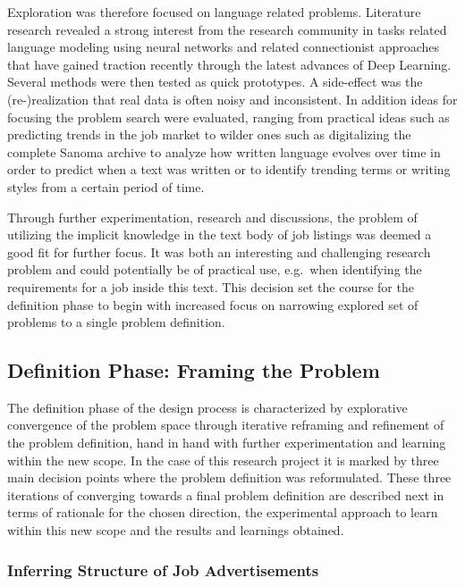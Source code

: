 Exploration was therefore focused on language related problems. Literature research revealed a strong interest from the research community in tasks related language modeling using neural networks and related connectionist approaches that have gained traction recently through the latest advances of \gls{Deep Learning}. Several methods were then tested as quick prototypes. A side-effect was the (re-)realization that real data is often noisy and inconsistent. In addition ideas for focusing the problem search were evaluated, ranging from practical ideas such as predicting trends in the job market to wilder ones such as digitalizing the complete Sanoma archive to analyze how written language evolves over time in order to predict when a text was written or to identify trending terms or writing styles from a certain period of time.

Through further experimentation, research and discussions, the problem of utilizing the implicit knowledge in the text body of job listings was deemed a good fit for further focus. It was both an interesting and challenging research problem and could potentially be of practical use, e.g.\ when identifying the requirements for a job inside this text. This decision set the course for the definition phase to begin with increased focus on narrowing explored set of problems to a single problem definition.

\subsection{Definition Phase: Framing the Problem}
\label{sub:Definition Phase: Framing the Problem}

The definition phase of the design process is characterized by explorative convergence of the problem space through iterative reframing and refinement of the problem definition, hand in hand with further experimentation and learning within the new scope. In the case of this research project it is marked by three main decision points where the problem definition was reformulated.
These three iterations of converging towards a final problem definition are described next in terms of rationale for the chosen direction, the experimental approach to learn within this new scope and the results and learnings obtained.

\subsubsection{Inferring Structure of Job Advertisements}
\label{subs:Inferring Structure in Job Advertisements}

